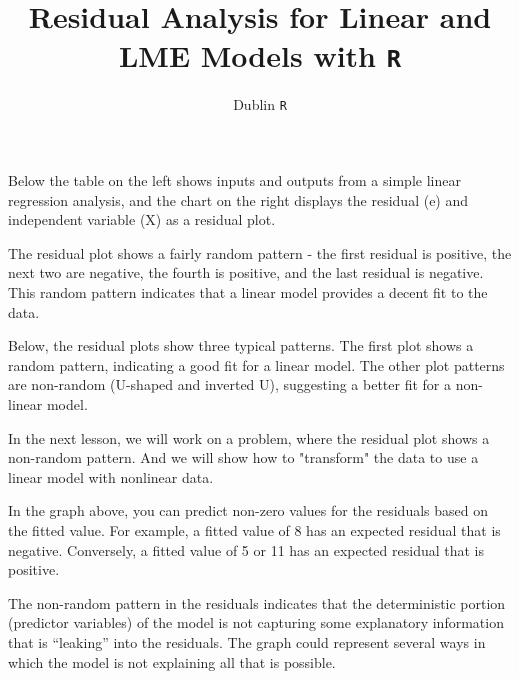 
\title{Residual Analysis for Linear and LME Models with \texttt{R}}
\author{Dublin \texttt{R}}







\maketitle

\tableofcontents

Below the table on the left shows inputs and outputs from a simple linear regression analysis, and the chart on the right displays the residual (e) and independent variable (X) as a residual plot.

\newpage
The residual plot shows a fairly random pattern - the first residual is positive, the next two are negative, the fourth is positive, and the last residual is negative. This random pattern indicates that a linear model provides a decent fit to the data.

Below, the residual plots show three typical patterns. The first plot shows a random pattern, indicating a good fit for a linear model. The other plot patterns are non-random (U-shaped and inverted U), suggesting a better fit for a non-linear model.

		
In the next lesson, we will work on a problem, where the residual plot shows a non-random pattern. And we will show how to "transform" the data to use a linear model with nonlinear data.

\newpage
In the graph above, you can predict non-zero values for the residuals based on the fitted value. For example, a fitted value of 8 has an expected residual that is negative. Conversely, a fitted value of 5 or 11 has an expected residual that is positive.

The non-random pattern in the residuals indicates that the deterministic portion (predictor variables) of the model is not capturing some explanatory information that is “leaking” into the residuals. The graph could represent several ways in which the model is not explaining all that is possible. 

